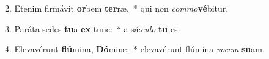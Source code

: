 
2. Etenim firmávit \textbf{or}bem \textbf{ter}ræ,~* qui non \textit{com}\textit{mo}\textbf{vé}bitur.

3. Paráta sedes \textbf{tu}a \textbf{ex} tunc:~* a s\'{\ae}\textit{cu}\textit{lo} \textbf{tu} es.

4. Elevavérunt \textbf{flú}mina, \textbf{Dó}mine:~* elevavérunt flúmina \textit{vo}\textit{cem} \textbf{su}am.

